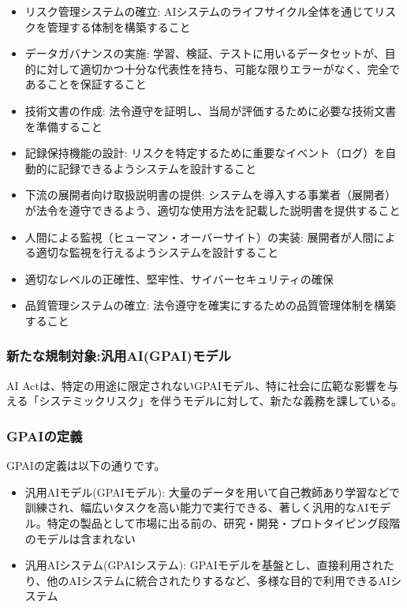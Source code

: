 \begin{itemize}
    \item リスク管理システムの確立: AIシステムのライフサイクル全体を通じてリスクを管理する体制を構築すること
    \item データガバナンスの実施: 学習、検証、テストに用いるデータセットが、目的に対して適切かつ十分な代表性を持ち、可能な限りエラーがなく、完全であることを保証すること
    \item 技術文書の作成: 法令遵守を証明し、当局が評価するために必要な技術文書を準備すること
    \item 記録保持機能の設計: リスクを特定するために重要なイベント（ログ）を自動的に記録できるようシステムを設計すること
    \item 下流の展開者向け取扱説明書の提供: システムを導入する事業者（展開者）が法令を遵守できるよう、適切な使用方法を記載した説明書を提供すること
    \item 人間による監視（ヒューマン・オーバーサイト）の実装: 展開者が人間による適切な監視を行えるようシステムを設計すること
    \item 適切なレベルの正確性、堅牢性、サイバーセキュリティの確保
    \item 品質管理システムの確立: 法令遵守を確実にするための品質管理体制を構築すること
\end{itemize}

\subsubsection{新たな規制対象:汎用AI(GPAI)モデル}
AI Actは、特定の用途に限定されないGPAIモデル、特に社会に広範な影響を与える「システミックリスク」を伴うモデルに対して、新たな義務を課している。

\subsubsection*{GPAIの定義}

GPAIの定義は以下の通りです。

\begin{itemize}
    \item 汎用AIモデル(GPAIモデル): 大量のデータを用いて自己教師あり学習などで訓練され、幅広いタスクを高い能力で実行できる、著しく汎用的なAIモデル。特定の製品として市場に出る前の、研究・開発・プロトタイピング段階のモデルは含まれない
    \item 汎用AIシステム(GPAIシステム): GPAIモデルを基盤とし、直接利用されたり、他のAIシステムに統合されたりするなど、多様な目的で利用できるAIシステム
\end{itemize}


